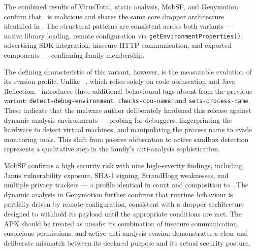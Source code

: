 The combined results of VirusTotal, static analysis, MobSF, and Genymotion confirm that \twor\ is malicious and shares the same core dropper architecture identified in \oner.
The structural patterns are consistent across both variants --- native library loading, remote configuration via \texttt{getEnvironmentProperties()}, advertising SDK integration, insecure HTTP communication, and exported components --- confirming family membership.

The defining characteristic of this variant, however, is the measurable evolution of its evasion profile.
Unlike \oner\ , which relies solely on code obfuscation and Java Reflection, \twor\ introduces three additional behavioural tags absent from the previous variant: \texttt{detect-debug-environment}, \texttt{checks-cpu-name}, and \texttt{sets-process-name}.
These indicate that the malware author deliberately hardened this release against dynamic analysis environments --- probing for debuggers, fingerprinting the hardware to detect virtual machines, and manipulating the process name to evade monitoring tools.
This shift from passive obfuscation to active sandbox detection represents a qualitative step in the family's anti-analysis sophistication.

MobSF confirms a high security risk with nine high-severity findings, including Janus vulnerability exposure, SHA-1 signing, StrandHogg weaknesses, and multiple privacy trackers --- a profile identical in count and composition to \oner.
The dynamic analysis in Genymotion further confirms that runtime behaviour is partially driven by remote configuration, consistent with a dropper architecture designed to withhold its payload until the appropriate conditions are met.
The APK should be treated as unsafe: its combination of insecure communication, suspicious permissions, and active anti-analysis evasion demonstrates a clear and deliberate mismatch between its declared purpose and its actual security posture.
